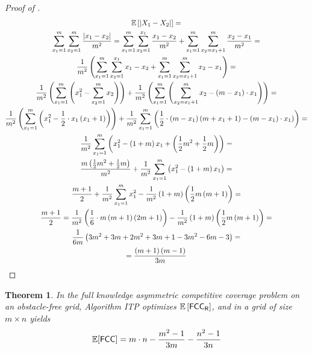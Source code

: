 \documentclass[a4paper,11pt]{article}
\newtheorem{theorem}{Theorem}
\theoremstyle{definition}
\newcommand{\rob}{{{\sf R}}\xspace}
\newcommand{\fcc}{{{\sf{FCC}}}\xspace}
\newcommand{\itp}{{{\textsf{ITP}}}\xspace}
\DeclarePairedDelimiter\abs{\lvert}{\rvert}%
\begin{document}
\begin{proof}[Proof of ]
\begin{multline}
\mathbb{E}\left[\abs*{X_1-X_2}\right] = \\
\sum_{x_1=1}^{m}\sum_{x_2=1}^{m}{\frac{\abs*{x_1-x_2}}{m^2}} = \sum_{x_1=1}^{m}\sum_{x_2=1}^{x_1}{\frac{x_1-x_2}{m^2}}+\sum_{x_1=1}^{m}\sum_{x_2=x_1+1}^{m}{\frac{x_2-x_1}{m^2}}=\\
\frac{1}{m^2}\left(\sum_{x_1=1}^{m}\sum_{x_2=1}^{x_1}{x_1-x_2}+\sum_{x_1=1}^{m}\sum_{x_2=x_1+1}^{m}{x_2-x_1}\right)=\\
\frac{1}{m^2}\left(\sum_{x_1=1}^{m}{\left(x_1^2-\sum_{x_2=1}^{m}{x_2}\right)}\right)+
\frac{1}{m^2}\left(\sum_{x_1=1}^{m}\left(\sum_{x_2=x_1+1}^{m}{x_2}-\left(m-x_1\right)\cdot x_1\right)\right)=\\
\frac{1}{m^2}\left(\sum_{x_1=1}^{m}{\left(x_1^2-\frac{1}{2}\cdot x_1\left(x_1+1\right)\right)}\right)+
\frac{1}{m^2}\sum_{x_1=1}^{m}\left(\frac{1}{2}\cdot \left(m-x_1\right)\left(m+x_1+1)-\left(m-x_1\right)\cdot x_1\right)\right)=\\
\frac{1}{m^2}\sum_{x_1=1}^{m}{\left(x_1^2-\left(1+m\right)x_1+\left(\frac{1}{2}m^2+\frac{1}{2}m\right)\right)}=\\
\frac{m\left(\frac{1}{2}m^2+\frac{1}{2}m\right)}{m^2}+\frac{1}{m^2}\sum_{x_1=1}^{m}{\left(x_1^2-\left(1+m\right)x_1\right)}=\\
\frac{m+1}{2}+\frac{1}{m^2}\sum_{x_1=1}^{m}{x_1^2}-\frac{1}{m^2}\left(1+m\right)\left(\frac{1}{2}m\left(m+1\right)\right)=\\
\frac{m+1}{2}=\frac{1}{m^2}\left(\frac{1}{6}\cdot m\left(m+1\right)\left(2m+1\right)\right)-
\frac{1}{m^2}\left(1+m\right)\left(\frac{1}{2}m\left(m+1\right)\right)=\\
\frac{1}{6m}\left(3m^2+3m+2m^2+3m+1-3m^2-6m-3\right)=\\
=\frac{\left(m+1\right)\left(m-1\right)}{3m}
\label{equations: 123}
\end{multline}

\end{proof}


\begin{theorem}\label{theorems: itp optimality expected fcc}
In the full knowledge asymmetric competitive coverage problem on an obstacle-free grid, Algorithm \itp optimizes $\mathbb{E}\left[\fcc_{\rob}\right]$, and in a grid of size $m\times n$ yields
\[\mathbb{E}[\fcc] = m\cdot n-\frac{m^2-1}{3m}-\frac{n^2-1}{3n}\]


\end{theorem}
\end{document}
